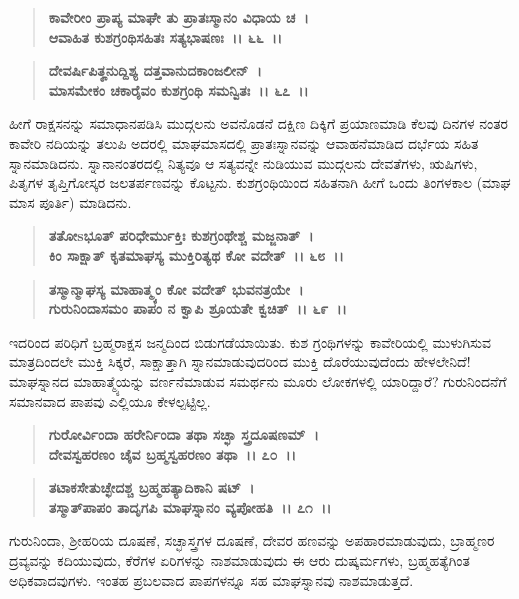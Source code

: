 \begin{verse}
\textbf{ಕಾವೇರೀಂ ಪ್ರಾಪ್ಯ ಮಾಘೇ ತು ಪ್ರಾತಃಸ್ಮಾನಂ ವಿಧಾಯ ಚ~।}\\\textbf{ಆವಾಹಿತ ಕುಶಗ್ರಂಥಿಸಹಿತಃ ಸತ್ಯಭಾಷಣಃ~।। ೬೬~।। }
\end{verse}

\begin{verse}
\textbf{ದೇವರ್ಷಿಪಿತೄನುದ್ದಿಶ್ಯ ದತ್ತವಾನುದಕಾಂಜಲೀನ್~।}\\\textbf{ಮಾಸಮೇಕಂ ಚಕಾರೈವಂ ಕುಶಗ್ರಂಥಿ ಸಮನ್ವಿತಃ~।। ೬೭~।।}
\end{verse}

ಹೀಗೆ ರಾಕ್ಷಸನನ್ನು ಸಮಾಧಾನಪಡಿಸಿ ಮುದ್ಗಲನು ಅವನೊಡನೆ ದಕ್ಷಿಣ ದಿಕ್ಕಿಗೆ ಪ್ರಯಾಣಮಾಡಿ ಕೆಲವು ದಿನಗಳ ನಂತರ ಕಾವೇರಿ ನದಿಯನ್ನು ತಲುಪಿ ಅದರಲ್ಲಿ ಮಾಘಮಾಸದಲ್ಲಿ ಪ್ರಾತಃಸ್ನಾನವನ್ನು ಆವಾಹನೆಮಾಡಿದ ದರ್ಭೆಯ ಸಹಿತ ಸ್ನಾನಮಾಡಿದನು. ಸ್ನಾನಾನಂತರದಲ್ಲಿ ನಿತ್ಯವೂ ಆ ಸತ್ಯವನ್ನೇ ನುಡಿಯುವ ಮುದ್ಗಲನು ದೇವತೆಗಳು, ಋಷಿಗಳು, ಪಿತೃಗಳ ತೃಪ್ತಿಗೋಸ್ಕರ ಜಲತರ್ಪಣವನ್ನು ಕೊಟ್ಟನು. ಕುಶಗ್ರಂಥಿಯಿಂದ ಸಹಿತನಾಗಿ ಹೀಗೆ ಒಂದು ತಿಂಗಳಕಾಲ (ಮಾಘ ಮಾಸ ಪೂರ್ತಿ) ಮಾಡಿದನು.

\begin{verse}
\textbf{ತತೋsಭೂತ್ ಪರಿಧೇರ್ಮುಕ್ತಿಃ ಕುಶಗ್ರಂಥೇಶ್ಚ ಮಜ್ಜನಾತ್~।}\\\textbf{ಕಿಂ ಸಾಕ್ಷಾತ್ ಕೃತಮಾಘಸ್ಯ ಮುಕ್ತಿರಿತ್ಯಥ ಕೋ ವದೇತ್~।। ೬೮~।।} 
\end{verse}

\begin{verse}
\textbf{ತಸ್ಮಾನ್ಮಾಘಸ್ಯ ಮಾಹಾತ್ಮ್ಯಂ ಕೋ ವದೇತ್ ಭುವನತ್ರಯೇ~।}\\\textbf{ಗುರುನಿಂದಾಸಮಂ ಪಾಪಂ ನ ಕ್ವಾಪಿ ಶ್ರೂಯತೇ ಕ್ವಚಿತ್~।। ೬೯~।।}
\end{verse}

ಇದರಿಂದ ಪರಿಧಿಗೆ ಬ್ರಹ್ಮರಾಕ್ಷಸ ಜನ್ಮದಿಂದ ಬಿಡುಗಡೆಯಾಯಿತು. ಕುಶ ಗ್ರಂಥಿಗಳನ್ನು ಕಾವೇರಿಯಲ್ಲಿ ಮುಳುಗಿಸುವ ಮಾತ್ರದಿಂದಲೇ ಮುಕ್ತಿ ಸಿಕ್ಕರೆ, ಸಾಕ್ಷಾತ್ತಾಗಿ ಸ್ನಾನಮಾಡುವುದರಿಂದ ಮುಕ್ತಿ ದೊರೆಯುವುದೆಂದು ಹೇಳಲೇನಿದೆ! ಮಾಘಸ್ನಾನದ ಮಾಹಾತ್ಮ್ಯೆಯನ್ನು ವರ್ಣನೆ\-ಮಾಡುವ ಸಮರ್ಥನು ಮೂರು ಲೋಕಗಳಲ್ಲಿ ಯಾರಿದ್ದಾರೆ? ಗುರುನಿಂದನೆಗೆ ಸಮಾನವಾದ ಪಾಪವು ಎಲ್ಲಿಯೂ ಕೇಳಲ್ಪಟ್ಟಿಲ್ಲ.

\begin{verse}
\textbf{ಗುರೋರ್ವಿಂದಾ ಹರೇರ್ನಿಂದಾ ತಥಾ ಸಚ್ಛಾ ಸ್ತ್ರದೂಷಣಮ್~।}\\\textbf{ದೇವಸ್ವಹರಣಂ ಚೈವ ಬ್ರಹ್ಮಸ್ವಹರಣಂ ತಥಾ~।। ೭೦~।।} 
\end{verse}

\begin{verse}
\textbf{ತಟಾಕಸೇತುಚ್ಛೇದಶ್ಚ ಬ್ರಹ್ಮಹತ್ಯಾದಿಕಾನಿ ಷಟ್~।}\\\textbf{ತಸ್ಮಾತ್‌ಪಾಪಂ ತಾದೃಗಪಿ ಮಾಘಸ್ನಾನಂ ವ್ಯಪೋಹತಿ~।। ೭೧~।।}
\end{verse}

ಗುರುನಿಂದಾ, ಶ‍್ರೀಹರಿಯ ದೂಷಣೆ, ಸಚ್ಛಾಸ್ತ್ರಗಳ ದೂಷಣೆ, ದೇವರ ಹಣವನ್ನು ಅಪಹಾರಮಾಡುವುದು, ಬ್ರಾಹ್ಮಣರ ದ್ರವ್ಯವನ್ನು ಕದಿಯುವುದು, ಕೆರೆಗಳ ಏರಿಗಳನ್ನು ನಾಶಮಾಡುವುದು ಈ ಆರು ದುಷ್ಕರ್ಮಗಳು, ಬ್ರಹ್ಮಹತ್ಯೆಗಿಂತ ಅಧಿಕವಾದವುಗಳು. ಇಂತಹ ಪ್ರಬಲವಾದ ಪಾಪಗಳನ್ನೂ ಸಹ ಮಾಘಸ್ನಾನವು ನಾಶಮಾಡುತ್ತದೆ.

